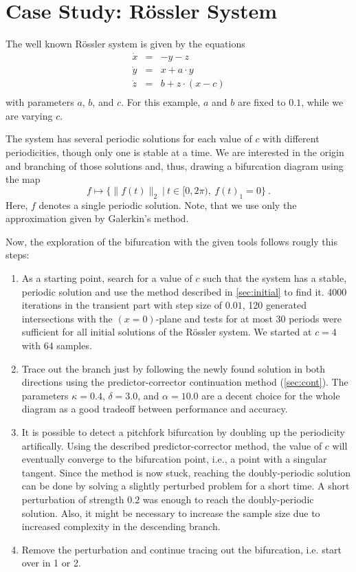 \section{Case Study: Rössler System}

The well known Rössler system is given by the equations
\[
	\begin{array}{rcl}
		\dot x &=& -y - z \\
		\dot y &=& x + a \cdot y \\
		\dot z &=& b + z \cdot (x - c) \\
	\end{array}
\]
with parameters $a$, $b$, and $c$. For this example, $a$ and $b$
are fixed to $0.1$, while we are varying $c$.

The system has several periodic solutions for each value of $c$ with different
periodicities, though only one is stable at a time. We are interested in the origin and
branching of those solutions and, thus, drawing a bifurcation diagram using the map
\[
	f \mapsto \{ \|f(t)\|_2  \ | \ t \in [0, 2\pi), \ f(t)_1 = 0 \} \ .
\]
Here, $f$ denotes a single periodic solution. Note, that we use only the approximation
given by Galerkin's method.

Now, the exploration of the bifurcation with the given tools follows rougly this steps:
\begin{enumerate}
	\item As a starting point, search for a value of $c$ such that the system has a
		stable, periodic solution and use the method described in
		\autoref{sec:initial} to find it. 4000 iterations in the transient part with step
		size of $0.01$, 120 generated intersections with the $(x=0)$-plane and tests for
		at most $30$ periods were sufficient for all initial solutions of the Rössler
		system. We started at $c=4$ with $64$ samples.
	\item Trace out the branch just by following the newly found solution in both directions
		using the predictor-corrector continuation method (\autoref{sec:cont}). The
		parameters $\kappa=0.4$, $\delta=3.0$, and $\alpha=10.0$ are a decent choice for
		the whole diagram as a good tradeoff between performance and accuracy.
	\item It is possible to detect a pitchfork bifurcation by doubling up the periodicity
		artifically. Using the described predictor-corrector method, the value
		of $c$ will eventually converge to the bifurcation point, i.e., a point with a
		singular tangent. Since the method is now stuck, reaching the doubly-periodic
		solution can be done by solving a slightly perturbed problem for a short time.
		A short perturbation of strength $0.2$ was enough to reach the doubly-periodic
		solution. Also, it might be necessary to increase the sample size due to increased
		complexity in the descending branch.
	\item Remove the perturbation and continue tracing out the bifurcation, i.e. start
		over in 1 or 2.
\end{enumerate}

